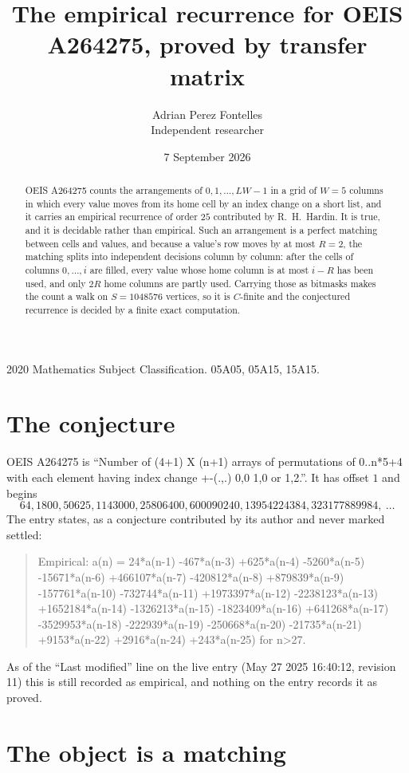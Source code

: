 \documentclass[11pt,a4paper]{article}
\title{The empirical recurrence for OEIS A264275, proved by transfer matrix}
\author{Adrian Perez Fontelles\\ \small Independent researcher}
\date{7 September 2026}
\theoremstyle{plain}
\theoremstyle{definition}
\begin{document}
\maketitle

\begin{abstract}
OEIS A264275 counts the arrangements of $0,1,\dots,LW-1$ in a grid of $W=5$ columns in which
every value moves from its home cell by an index change on a short list, and it carries an
empirical recurrence of order $25$ contributed by R.~H.~Hardin. It is true, and it is
decidable rather than empirical. Such an arrangement is a perfect matching between cells and
values, and because a value's row moves by at most $R=2$, the matching splits into
independent decisions column by column: after the cells of columns $0,\dots,i$ are filled,
every value whose home column is at most $i-R$ has been used, and only $2R$ home columns are
partly used. Carrying those as bitmasks makes the count a walk on $S=1048576$ vertices, so it is
$C$-finite and the conjectured recurrence is decided by a finite exact computation.
\end{abstract}

\noindent\small 2020 Mathematics Subject Classification. 05A05, 05A15, 15A15.\normalsize

\section{The conjecture}

OEIS A264275 is ``Number of (4+1) X (n+1) arrays of permutations of 0..n*5+4 with each element having index change +-(.,.) 0,0 1,0 or 1,2.''. It has offset $1$ and begins
\[
64, 1800, 50625, 1143000, 25806400, 600090240, 13954224384, 323177889984,\ \dots
\]
The entry states, as a conjecture contributed by its author and never marked settled:
\begin{quote}
Empirical: a(n) = 24*a(n-1) -467*a(n-3) +625*a(n-4) -5260*a(n-5) -15671*a(n-6) +466107*a(n-7) -420812*a(n-8) +879839*a(n-9) -157761*a(n-10) -732744*a(n-11) +1973397*a(n-12) -2238123*a(n-13) +1652184*a(n-14) -1326213*a(n-15) -1823409*a(n-16) +641268*a(n-17) -3529953*a(n-18) -222939*a(n-19) -250668*a(n-20) -21735*a(n-21) +9153*a(n-22) +2916*a(n-24) +243*a(n-25) for n>27.
\end{quote}
As of the ``Last modified'' line on the live entry (May 27 2025 16:40:12, revision 11) this is still
recorded as empirical, and nothing on the entry records it as proved.

\section{The object is a matching}
\end{document}
